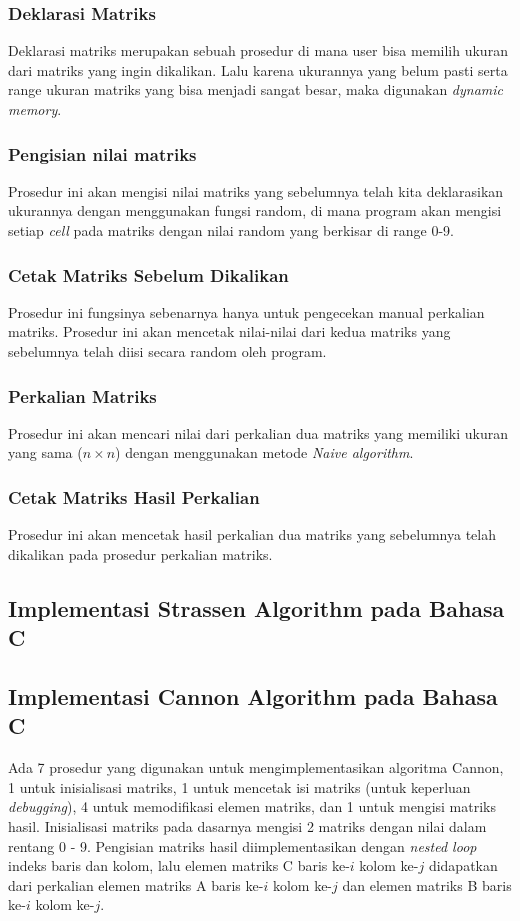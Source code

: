 \documentclass[conference]{IEEEtran}
\begin{document}
\subsubsection{Deklarasi Matriks}
Deklarasi matriks merupakan sebuah prosedur di mana user bisa memilih ukuran dari matriks yang ingin dikalikan. Lalu karena ukurannya yang belum pasti serta range ukuran matriks yang bisa menjadi sangat besar, maka digunakan \textit{dynamic memory}.
\subsubsection{Pengisian nilai matriks}
Prosedur ini akan mengisi nilai matriks yang sebelumnya telah kita deklarasikan ukurannya dengan menggunakan fungsi random, di mana program akan mengisi setiap \textit{cell} pada matriks dengan nilai random yang berkisar di range 0-9.
\subsubsection{Cetak Matriks Sebelum Dikalikan}
Prosedur ini fungsinya sebenarnya hanya untuk pengecekan manual perkalian matriks. Prosedur ini akan mencetak nilai-nilai dari kedua matriks yang sebelumnya telah diisi secara random oleh program.
\subsubsection{Perkalian Matriks}
Prosedur ini akan mencari nilai dari perkalian dua matriks yang memiliki ukuran yang sama ($n\times n$) dengan menggunakan metode \textit{Naive algorithm}.
\subsubsection{Cetak Matriks Hasil Perkalian}
Prosedur ini akan mencetak hasil perkalian dua matriks yang sebelumnya telah dikalikan pada prosedur perkalian matriks.

\subsection{Implementasi Strassen Algorithm pada Bahasa C}

\subsection{Implementasi Cannon Algorithm pada Bahasa C}
Ada 7 prosedur yang digunakan untuk mengimplementasikan algoritma Cannon, 1 untuk inisialisasi matriks, 1 untuk mencetak isi matriks (untuk keperluan \textit{debugging}), 
4 untuk memodifikasi elemen matriks, dan 1 untuk mengisi matriks hasil.
Inisialisasi matriks pada dasarnya mengisi 2 matriks dengan nilai dalam rentang 0 - 9.
Pengisian matriks hasil diimplementasikan dengan \textit{nested loop} indeks baris dan kolom, 
lalu elemen matriks C baris ke-$i$ kolom ke-$j$ didapatkan dari perkalian elemen matriks A baris ke-$i$ kolom ke-$j$ dan elemen matriks B baris ke-$i$ kolom ke-$j$.
\end{document}
